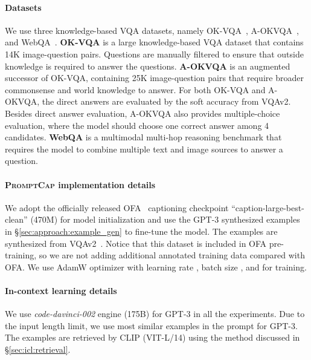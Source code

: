 \documentclass[10pt,twocolumn,letterpaper]{article}
\newcommand{\NAME}{\textsc{PromptCap}\xspace}
\begin{document}
\paragraph{Datasets} We use three knowledge-based VQA datasets, namely OK-VQA~\cite{marino2019okvqa}, A-OKVQA~\cite{schwenk2022aokvqa}, and WebQA~\cite{chang2022webqa}.
\textbf{OK-VQA}\cite{marino2019okvqa} is a large knowledge-based VQA dataset that contains 14K image-question pairs. Questions are manually filtered to ensure that outside knowledge is required to answer the questions.
\textbf{A-OKVQA}\cite{schwenk2022aokvqa} is an augmented successor of OK-VQA, containing 25K image-question pairs that require broader commonsense and world knowledge to answer.
For both OK-VQA and A-OKVQA, the direct answers are evaluated by the soft accuracy from VQAv2\cite{goyal2017making}.
Besides direct answer evaluation,
A-OKVQA also provides multiple-choice evaluation, where the model should choose one correct answer among 4 candidates. 
\textbf{WebQA} \cite{chang2022webqa} is a multimodal multi-hop reasoning benchmark that requires the model to combine multiple text and image sources to answer a question.

\vspace{-0.1in}
\paragraph{\NAME implementation details}
We adopt the officially released OFA~\cite{wang2022ofa} captioning checkpoint ``caption-large-best-clean'' (470M) for model initialization and use the GPT-3 synthesized examples in \S\ref{sec:approach:example_gen} to fine-tune the model. The examples are synthesized from VQAv2~\cite{antol2015vqa, goyal2017making}. Notice that this dataset is included in OFA pre-training, so we are not adding additional annotated training data compared with OFA. We use AdamW \cite{Kingma2015AdamAM} optimizer with learning rate , batch size , and  for training.

\vspace{-0.1in}
\paragraph{In-context learning details} We use {\it code-davinci-002} engine (175B) for GPT-3 in all the experiments. Due to the input length limit, we use  most similar examples in the prompt for GPT-3. The examples are retrieved by CLIP (VIT-L/14) using the method discussed in \S\ref{sec:icl:retrieval}.
\end{document}
